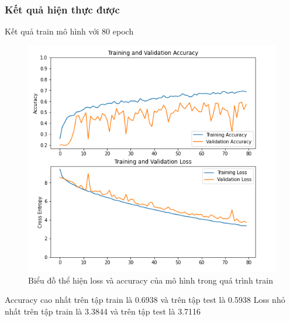 \subsubsection{Kết quả  hiện thực được } %
Kết quả train mô hình với 80 epoch
\begin{figure}[H]
    \centering
    \includegraphics[width=\linewidth]{images/Quanh/graph.png}
    \caption{ Biểu đồ thể hiện loss và accuracy của mô hình trong quá trình train}
    \label{fig:graph}
\end{figure}
Accuracy cao nhất trên tập train là 0.6938 và trên tập test là 0.5938
Loss nhỏ nhất trên tập train là 3.3844 và trên tập test là 3.7116

